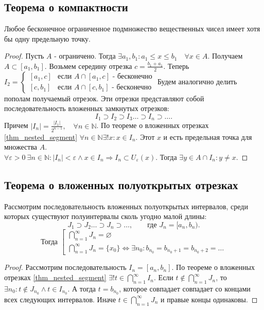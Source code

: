 \documentclass[11pt]{book}
\newcommand{\N}{\mathbb{N}}
\renewcommand{\le}{\leqslant}
\theoremstyle{definition}
\theoremstyle{plain}
\theoremstyle{plain}
\theoremstyle{definition}
\theoremstyle{remark}
\begin{document}
\subsection{Теорема о компактности}\label{ques_11}
\begin{thm}[о компактности]
    Любое бесконечное ограниченное подмножество вещественных чисел имеет хотя бы одну предельную точку.
\end{thm}
\begin{proof}
    Пусть $A$ - ограничено. Тогда $\exists a_1, b_1: a_1 \le x \le b_1 \quad \forall x \in A$. Получаем $A \subset [a_1, b_1]$. Возьмем середину отрезка $c = \frac{b_1+a_1}{2}$. Теперь $I_2 = \left \{ 
    \begin{array}{ll}
	{[a_1, c]} & \mbox{если } A \cap [a_1, c] \mbox{ - бесконечно}\\
	{[c, b_1]} & \mbox{если } A \cap [c, b_1] \mbox{ - бесконечно}
\end{array}
\right .$
Будем аналогично делить пополам получаемый отрезок. Эти отрезки представляют собой последовательность вложенных замкнутых отрезков: \[
I_1 \supset I_2 \supset I_3 \ldots \supset I_n \supset \ldots 
.\] 
Причем $|I_n| = \frac{|I_1|}{2^{n-1}} , \quad \forall n \in \N$. По теореме о вложенных отрезках \ref{thm_nested_segment} $\forall n \in \N \exists ! x: x \in I_n $. Этот $x$ и есть предельная точка для множества $A $.\\
$\forall \varepsilon  > 0 ~\exists n \in \N: |I_n| < \varepsilon \wedge x \in I_n \Rightarrow I_n \subset U_{\varepsilon } (x)$. Тогда $\exists y \in A \cap I_n: y\ne x$. 
\end{proof}
\subsection{Теорема о вложенных полуоткрытых отрезках}\label{ques_12}
\begin{thm}\label{thm_nested_segment_2}
    Рассмотрим последовательность вложенных полуоткрытых интервалов, среди которых существуют полуинтервалы сколь угодно малой длины:
    \[
	J_1 \supset J_2 \ldots \supset J_n \supset\ldots  ,  \qquad \mbox{где } J_n = [a_n, b_n)
    .\] 
    \[
    \mbox{Тогда } \left [ 
    \begin{array}{l}
	\bigcap \limits_{n=1}^{\infty} J_n = \varnothing\\
	\bigcap \limits_{n=1}^{\infty} J_n = \{x_0\} \Longleftrightarrow \exists n_0 : b_{n_0} = b_{n_0 + 1} = b_{n_0 +2} =\ldots 
    \end{array}
    \right .
    \] 
\end{thm}
\begin{proof}
    Рассмотрим последовательность $I_n = [a_n, b_n]$.
    По теореме о вложенных отрезках \ref{thm_nested_segment} $\exists ! t \in  \bigcap \limits_{n=1}^{\infty} I_n$. Если $t \notin \bigcap \limits_{n=1}^{\infty} J_n$, то $\exists n_0: t \notin J_{n_0} \wedge t \in I_{n_0}$.
    А тогда $t = b_{n_0}$, которое совпадает совпадает со концами всех следующих интервалов. Иначе $t \in \bigcap \limits_{n=1}^{\infty} J_n$ и правые концы одинаковы.
\end{proof}
\end{document}
